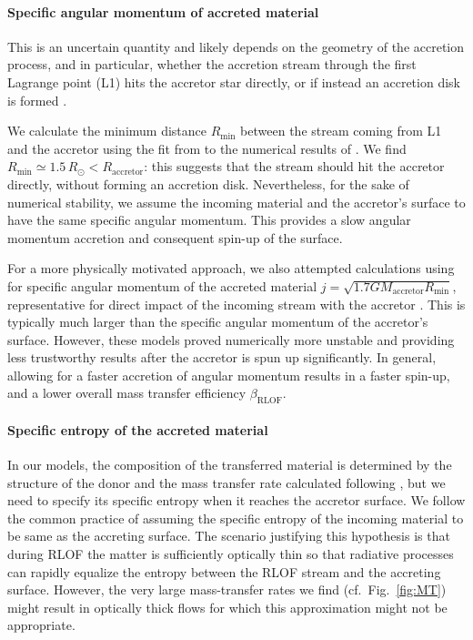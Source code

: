 \documentclass[twocolumn,twocolappendix,trackchanges]{aastex63}
\DeclareRobustCommand{\Figref}[1]{Fig.~\ref{#1}}
\begin{document}
\paragraph{Specific angular momentum of accreted material}
This is an uncertain quantity and likely depends on the geometry of
the accretion process, and in particular, whether the accretion stream
through the first Lagrange point (L1) hits the accretor star directly,
or if instead an accretion disk is formed \citep[e.g.,][]{demink:13}.

We calculate the minimum distance $R_\mathrm{min}$ between the stream
coming from L1 and the accretor using the fit from \cite{ulrich:76} to
the numerical results of \cite{lubow:75}. We find
$R_\mathrm{min}\simeq 1.5\,R_\odot < R_\mathrm{accretor}$: this
suggests that the stream should hit the accretor directly, without
forming an accretion disk. Nevertheless, for the sake of numerical
stability, we assume the incoming material and the accretor's surface to
have the same specific angular momentum. This provides a slow angular
momentum accretion and consequent spin-up of the surface.

For a more physically motivated approach, we also attempted
calculations using for specific angular momentum of the accreted
material $j=\sqrt{1.7GM_\mathrm{accretor}R_\mathrm{min}}$,
representative for direct impact of the incoming stream with the
accretor \citep{lubow:75}. This is typically much larger than the
specific angular momentum of the accretor's surface. However, these
models proved numerically more unstable and providing less trustworthy
results after the accretor is spun up significantly. In general,
allowing for a faster accretion of angular momentum results in a
faster spin-up, and a lower overall mass transfer efficiency
$\beta_\mathrm{RLOF}$.

\paragraph{Specific entropy of the accreted material}
In our models, the composition of the transferred material is
determined by the structure of the donor and the mass transfer rate
calculated following \cite{kolb:90}, but we need to specify its
specific entropy when it reaches the accretor surface. We follow the
common practice of assuming the specific entropy of the incoming
material to be same as the accreting surface. The scenario justifying
this hypothesis is that during RLOF the matter is sufficiently
optically thin so that radiative processes can rapidly equalize the
entropy between the RLOF stream and the accreting surface. However,
the very large mass-transfer rates we find (cf.~\Figref{fig:MT}) might
result in optically thick flows for which this approximation might not
be appropriate.
\end{document}
